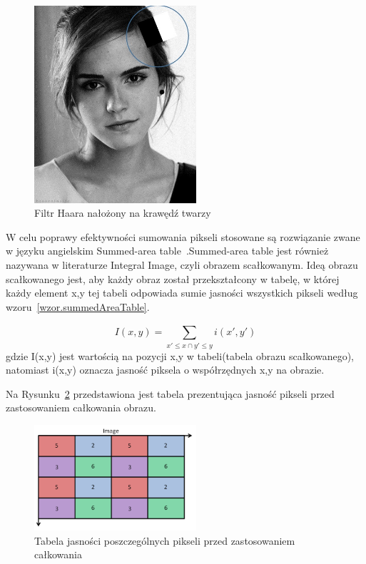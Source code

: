 \documentclass[a4paper,twoside,12pt]{book}
\begin{document}
    \begin{figure}
        \centering
        \includegraphics[width=6cm]{Obrazy/haarEmmaWatson.jpg}
        \caption{Filtr Haara nałożony na krawędź twarzy~\cite{haar}}
        \label{fig.haarEmmaWatson}
    \end{figure}

    W celu poprawy efektywności sumowania pikseli stosowane są
    rozwiązanie zwane w języku angielskim Summed-area table~\cite{violaJonesRealTimeOb}.Summed-area table jest również
    nazywana w literaturze Integral Image, czyli obrazem scałkowanym.
    Ideą obrazu scałkowanego jest,
    aby każdy obraz
    został
    przekształcony w
    tabelę, w której każdy element x,y tej tabeli odpowiada sumie jasności wszystkich pikseli według wzoru~\ref{wzor.summedAreaTable}.

    \large
    \begin{equation}
        I(x,y) = \sum_{{x}'\leq x \cap {y}'\leq y}^{} i({x}',{y}')
        \label{wzor.summedAreaTable}
    \end{equation}
    \normalsize
    gdzie I(x,y) jest wartością na pozycji x,y w tabeli(tabela obrazu scałkowanego), natomiast i(x,y) oznacza jasność piksela o
    współrzędnych x,y na obrazie.

    Na Rysunku~\ref{fig.przedCalkowaniem} przedstawiona jest tabela prezentująca jasność pikseli przed
    zastosowaniem całkowania obrazu.
    \begin{figure}
        \centering
        \includegraphics[width=6cm]{Obrazy/przedCalkowaniem.jpg}
        \caption{Tabela jasności poszczególnych pikseli przed zastosowaniem całkowania~\cite{integralImages}}
        \label{fig.przedCalkowaniem}
    \end{figure}
\end{document}
